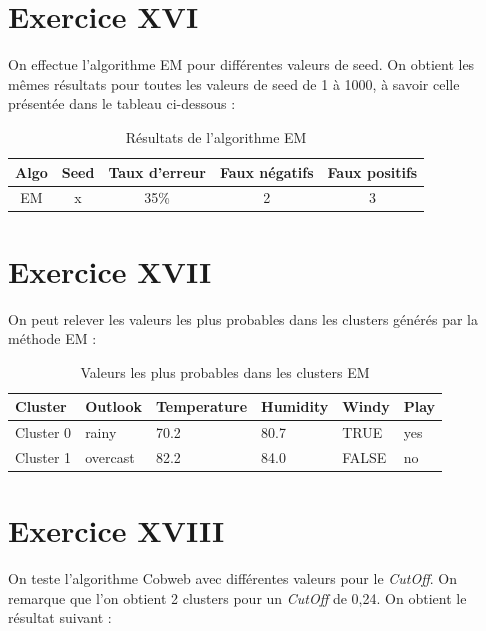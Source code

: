 \documentclass[a4paper, 11pt]{report}
\begin{document}
      \section{Exercice XVI}
        On effectue l'algorithme EM pour différentes valeurs de seed. On obtient les mêmes résultats pour toutes les valeurs de seed de 1 à 1000, à savoir celle présentée dans le tableau ci-dessous : 
        \begin{table}[h!]
        \centering
        \begin{tabular}{| c | c | c | c | c |}
        \hline
         Algo & Seed & Taux d'erreur & Faux négatifs & Faux positifs  \\
         \hline
         EM & x & 35\% & 2 & 3 \\
         \hline
         
        \end{tabular}
        \caption{Résultats de l'algorithme EM}
        \label{tab:exo16}
        \end{table}
        
        \section{Exercice XVII}
        On peut relever les valeurs les plus probables dans les clusters générés par la méthode EM :
        \begin{table}[h!]
        \centering
        \begin{tabular}{| l | l | l | l | l | l |}
        \hline
        Cluster & Outlook & Temperature & Humidity & Windy & Play \\
        \hline
        Cluster 0 & rainy & 70.2 & 80.7 & TRUE & yes \\
        \hline
        Cluster 1 & overcast & 82.2 & 84.0 & FALSE & no \\
        \hline

        \end{tabular}
        \caption{Valeurs les plus probables dans les clusters EM}
        \label{tab:exo_6}
        \end{table}
        
        \section{Exercice XVIII}
        On teste l'algorithme Cobweb avec différentes valeurs pour le \emph{CutOff}. On remarque que l'on obtient 2 clusters pour un \emph{CutOff} de 0,24. On obtient le résultat suivant : 
        
\end{document}
